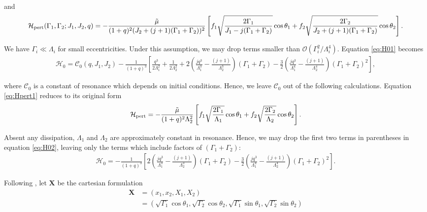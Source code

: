 \documentclass[usenatbib,twocolumn]{mnras}
\renewcommand{\v}[1]{\boldsymbol{ #1 }}
\begin{document}
\noindent
and
\begin{align}
  \label{eq:Hpert1}
  \mathcal{H}_{\rm pert}(\Gamma_1,\Gamma_2; J_1, J_2, q)
  = -\frac{\tilde\mu}{(1+q)^2(J_2+(j+1)(\Gamma_1+\Gamma_2))^2}
  \left[
    f_1\sqrt{\frac{2\Gamma_1}{J_1 - j(\Gamma_1+\Gamma_2)}}\cos\theta_1
  +f_2\sqrt{\frac{2\Gamma_2}{J_2 + (j+1)(\Gamma_1+\Gamma_2)}}\cos\theta_2
    \right].
\end{align}

\noindent We have \(\Gamma_i \ll \Lambda_i\) for small
eccentricities.  Under this assumption, we may drop terms smaller than
\(\mathcal{O}(\Gamma_i^2/\Lambda_i^4)\).  Equation \eqref{eq:H01} becomes
\begin{align}
  \label{eq:H02}
  \mathcal{H}_0
  = \mathcal C_0(q, J_1, J_2) -\frac{1}{(1+q)^3}\left[
     \frac{q^3}{2\Lambda_1^2} + \frac{1}{2\Lambda_2^2}
   + 2\left(
     \frac{jq^3}{\Lambda_1^3} - \frac{(j+1)}{\Lambda_2^3}
     \right)(\Gamma_1+\Gamma_2)
   -\frac32\left( 
     \frac{jq^3}{\Lambda_1^4} - \frac{(j+1)}{\Lambda_2^4}\right)
     (\Gamma_1+\Gamma_2)^2
     \right],
\end{align}

\noindent
where \(\mathcal C_0\) is a constant of resonance which depends on initial conditions.
Hence, we leave \(\mathcal C_0\) out of the following calculations.
Equation \eqref{eq:Hpert1} reduces to its original form
\begin{align}
\label{eq:H_3}
  \mathcal{H}_{\rm pert}
  =-\frac{\tilde\mu}{(1+q)^2\Lambda_2^2}
  \left[
  f_1\sqrt{\frac{2\Gamma_1}{\Lambda_1}}\cos\theta_1
  +f_2\sqrt{\frac{2\Gamma_2}{\Lambda_2}}\cos\theta_2
  \right].
\end{align}

\noindent Absent any dissipation, \(\Lambda_1\) and
\(\Lambda_2\) are approximately constant in resonance.  Hence, we may
drop the first two terms in parentheses in equation \eqref{eq:H02},
leaving only the terms which include factors of \((\Gamma_1+\Gamma_2)\):
\begin{align}
  \label{eq:H03}
  \mathcal{H}_0
  = -\frac{1}{(1+q)^3}\left[
   2\left(
     \frac{jq^3}{\Lambda_1^3} - \frac{(j+1)}{\Lambda_2^3}
     \right)(\Gamma_1+\Gamma_2)
   -\frac32\left( 
     \frac{jq^3}{\Lambda_1^4} - \frac{(j+1)}{\Lambda_2^4}\right)
     (\Gamma_1+\Gamma_2)^2
     \right].
\end{align}

Following \citep{henrard86_reduc_trans_apocen_librat}
\citep[or equivalently][]{wisdom_canonical_1986}, let \(\v X\) be the
cartesian formulation
\begin{align}
  \v X &= (x_1, x_2, X_1, X_2)\nonumber\\
  &= (\sqrt{\Gamma_1}\cos\theta_1, \sqrt{\Gamma_2}\cos\theta_2,
    \sqrt{\Gamma_1}\sin\theta_1, \sqrt{\Gamma_2}\sin\theta_2)
\end{align}
\end{document}
